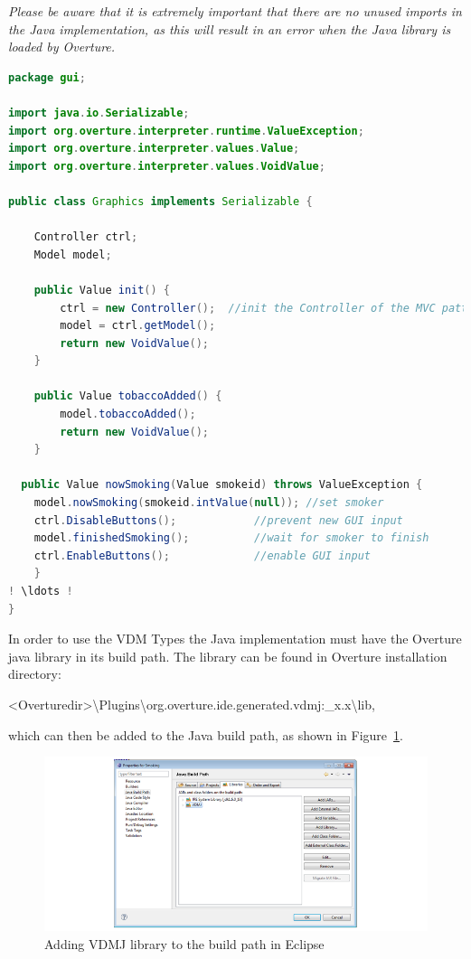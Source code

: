 \documentclass{overturerepchap}
\begin{document}
\emph{Please be aware that it is extremely important that there are no unused imports in the Java implementation, as this will result in an error when the Java library is loaded by Overture.} \\
\vspace{1in}
\begin{lstlisting}[language=Java,label=SmokersVDMInterfaceJavaImpl,caption=Java implementation of the VDM interface for the external Java library,captionpos=b]
package gui;

import java.io.Serializable;
import org.overture.interpreter.runtime.ValueException;
import org.overture.interpreter.values.Value;
import org.overture.interpreter.values.VoidValue;

public class Graphics implements Serializable {

    Controller ctrl;
    Model model;

    public Value init() {
    	ctrl = new Controller();  //init the Controller of the MVC pattern
    	model = ctrl.getModel();
        return new VoidValue();
    }

    public Value tobaccoAdded() {
        model.tobaccoAdded();
        return new VoidValue();
    }

  public Value nowSmoking(Value smokeid) throws ValueException {
	model.nowSmoking(smokeid.intValue(null)); //set smoker
	ctrl.DisableButtons(); 			  //prevent new GUI input
	model.finishedSmoking(); 		  //wait for smoker to finish
	ctrl.EnableButtons(); 			  //enable GUI input
    }
! \ldots !
}
\end{lstlisting}

In order to use the VDM Types the Java implementation must have the Overture java library in its build path. The library can be found in Overture installation directory:

 \textless  Overturedir\textgreater\textbackslash Plugins\textbackslash org.overture.ide.generated.vdmj:\_x.x\textbackslash lib,

\noindent which can then be added to the Java build path, as shown in Figure~\ref{fig:gui:VDMJBuildPath}.

\begin{figure}[h]
\begin{center}
  \includegraphics[width=\textwidth]{figures/SmokersVDMJBuildPath}
  \caption[labelInTOC]{Adding VDMJ library to the build path in Eclipse}
  \label{fig:gui:VDMJBuildPath}
\end{center}
\end{figure}
\end{document}
